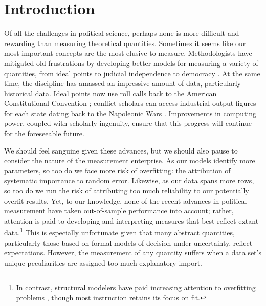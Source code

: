 \section{Introduction}

Of all the challenges in political science, perhaps none is more difficult and rewarding than measuring theoretical quantities. 
Sometimes it seems like our most important concepts are the most elusive to measure. 
Methodologists have mitigated old frustrations by developing better models for measuring a variety of quantities, from ideal points \citep{clinton2004} to judicial independence \citep{linzer2014} to democracy \citep{jackman2008}. 
At the same time, the discipline has amassed an impressive amount of data, particularly historical data. 
Ideal points now use roll calls back to the American Constitutional Convention \citep{heckelman2013}; conflict scholars can access industrial output figures for each state dating back to the Napoleonic Wars \citep{singer1972}. 
Improvements in computing power, coupled with scholarly ingenuity, ensure that this progress will continue for the foreseeable future.

We should feel sanguine given these advances, but we should also pause to consider the nature of the measurement enterprise. 
As our models identify more parameters, so too do we face more risk of overfitting: the attribution of systematic importance to random error. 
Likewise, as our data spans more rows, so too do we run the risk of attributing too much reliability to our potentially overfit results. 
Yet, to our knowledge, none of the recent advances in political measurement have taken out-of-sample performance into account; rather, attention is paid to developing and interpreting measures that best reflect extant data.\footnote{In contrast, structural modelers have paid increasing attention to overfitting problems \citep{pitt2002,preacher2006}, though most instruction retains its focus on fit.} 
This is especially unfortunate given that many abstract quantities, particularly those based on formal models of decision under uncertainty, reflect expectations. 
However, the measurement of any quantity suffers when a data set's unique peculiarities are assigned too much explanatory import.

